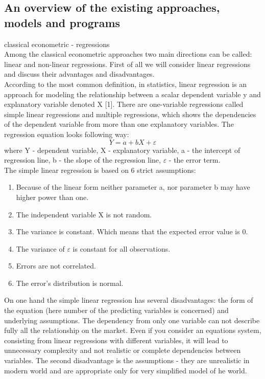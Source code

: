 \documentclass {article}
\begin{document}
\subsection{An overview of the existing approaches, models and programs}
classical econometric - regressions\\
Among the classical econometric approaches two main directions can be called: linear and non-linear regressions. First of all we will consider linear regressions and discuss their advantages and disadvantages.\\
According to the most common definition, in statistics, linear regression is an approach for modeling the relationship between a scalar dependent variable y and explanatory variable denoted X [1]. There are one-variable regressions called simple linear regressions and multiple regressions, which shows the dependencies of the dependent variable from more than one explanatory variables. The regression equation looks following way:\\
\[Y = a + bX + \varepsilon\]
where Y - dependent variable, X - explanatory variable, a - the intercept of regression line, b - the slope of the regression line, $\varepsilon$ - the error term.\\
The simple linear regression is based on 6 strict assumptions:
\begin{enumerate}
	\item Because of the linear form neither parameter a, nor parameter b may have higher power than one.
	\item The independent variable X is not random.
	\item The variance is constant. Which means that the expected error value is 0.
	\item The variance of $\varepsilon$ is constant for all observations.
	\item Errors are not correlated.
	\item The error's distribution is normal.
\end{enumerate}
On one hand the simple linear regression has several disadvantages: the form of the equation (here number of the predicting variables is concerned) and underlying assumptions. The dependency from only one variable can not describe fully all the relationship on the market. Even if you consider an equations system, consisting from linear regressions with different variables, it will lead to unnecessary complexity and not realistic or complete dependencies between variables. The second disadvantage is the assumptions - they are unrealistic in modern world and are appropriate only for very simplified model of he world.\\
\end{document}
